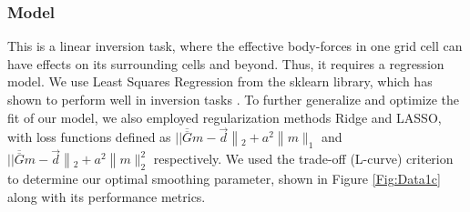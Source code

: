 \documentclass{article}
\begin{document}

\subsubsection{Model}

This is a linear inversion task, where the effective body-forces in one grid cell can have effects on its surrounding cells and beyond. Thus, it requires a regression model. We use Least Squares Regression from the sklearn library, which has shown to perform well in inversion tasks \cite{lines_review_1984}. To further generalize and optimize the fit of our model, we also employed regularization methods Ridge and LASSO, with loss functions defined as $|| \overline{\overline{G}} m-\vec{d}\left\|_{2}+a^{2}\right\| m \|_{1}$ and $|| \overline{\overline{G}} m-\vec{d}\left\|_{2}+a^{2}\right\| m \|_{2}^{2}$ respectively. We used the trade-off (L-curve) criterion to determine our optimal smoothing parameter, shown in Figure \ref{Fig:Data1c} along with its performance metrics.
\end{document}
